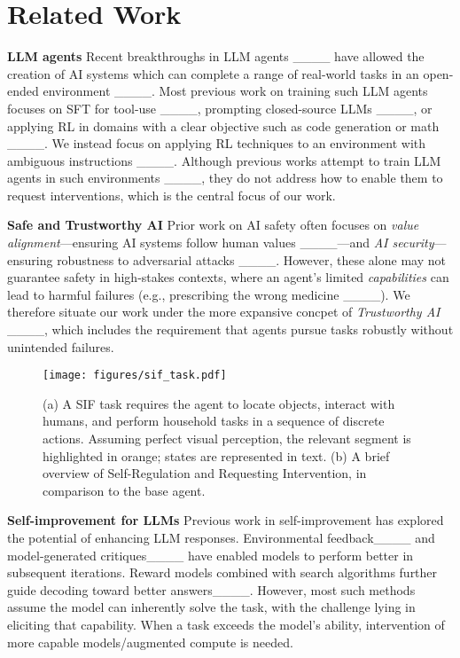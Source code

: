 \section{Related Work}
\textbf{LLM agents }  Recent breakthroughs in LLM agents ____  have allowed the creation of AI systems which can complete a range of real-world tasks in an open-ended environment ____.
Most previous work on training such LLM agents focuses on SFT for tool-use ____, prompting closed-source LLMs ____, or applying RL in domains with a clear objective such as code generation or math ____. We instead focus on applying RL techniques to an environment with ambiguous instructions ____. Although previous works attempt to train LLM agents in such environments ____, they do not address how to enable them to request interventions, which is the central focus of our work.

\textbf{Safe and Trustworthy AI } Prior work on AI safety often focuses on \emph{value alignment}—ensuring AI systems follow human values ____—and \emph{AI security}—ensuring robustness to adversarial attacks ____. However, these alone may not guarantee safety in high-stakes contexts, where an agent’s limited \emph{capabilities} can lead to harmful failures (e.g., prescribing the wrong medicine ____). We therefore situate our work under the more expansive concpet of \emph{Trustworthy AI} ____, which includes the requirement that agents pursue tasks robustly without unintended failures. 

\begin{figure*}[!t]
    \centering
    \texttt{[image: figures/sif\_task.pdf]}
    \vspace{-2em}
    \caption{(a) A SIF task requires the agent to locate objects, interact with humans, and perform household tasks in a sequence of discrete actions. Assuming perfect visual perception, the relevant segment is highlighted in orange; states are represented in text. (b) A brief overview of Self-Regulation and Requesting Intervention, in comparison to the base agent.}
    \label{fig:sif}
    \vspace{-1em}
\end{figure*}

\textbf{Self-improvement for LLMs }Previous work in self-improvement has explored the potential of enhancing LLM responses. 
Environmental feedback____ and model-generated critiques____ have enabled models to perform better in subsequent iterations. Reward models combined with search algorithms further guide decoding toward better answers____. However, most such methods assume the model can inherently solve the task, with the challenge lying in eliciting that capability. When a task exceeds the model’s ability, intervention of more capable models/augmented compute is needed.

